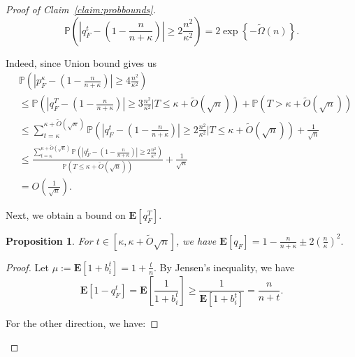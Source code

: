 \documentclass[11pt]{amsart}
\newtheorem{proposition}[theorem]{Proposition}
\begin{document}
\begin{proof}[Proof of Claim~\ref{claim:probbounds}]
\begin{equation}\label{eqn:p_F}
\mathbb{P}\left(\left|q_F^{t} - \left(1 - \frac{n}{n+\kappa}\right)\right| \geq 2\frac{n^2}{\kappa^2}\right) = 2\exp\left\{-\tilde{\Omega}(n)\right\}.
\end{equation}

Indeed, since Union bound gives us
\begin{align*}
&\mathbb{P}\left(\left|p_F^{\kappa} - \left(1 - \frac{n}{n+\kappa}\right)\right| \geq 4\frac{n^2}{\kappa^2}\right)\\
& \leq \mathbb{P}\left(\left|q_F^{T} - \left(1 - \frac{n}{n+\kappa}\right)\right| \geq 3\frac{n^2}{\kappa^2}\Big|T \leq \kappa + \tilde{O}(\sqrt{n})\right) + \mathbb{P}(T > \kappa + \tilde{O}(\sqrt{n})) \\
&  \leq \sum_{t = \kappa}^{\kappa + \tilde{O}(\sqrt{n})}\mathbb{P}\left(\left|q_F^{t} - \left(1 - \frac{n}{n+\kappa}\right)\right| \geq 2\frac{n^2}{\kappa^2}\Big|T \leq \kappa + \tilde{O}(\sqrt{n})\right) + \frac{1}{\sqrt{n}} \\
& \leq \frac{\sum_{t = \kappa}^{\kappa + \tilde{O}(\sqrt{n})}\mathbb{P}\left(\left|q_F^{t} - \left(1 - \frac{n}{n+\kappa}\right)\right| \geq 2\frac{n^2}{\kappa^2}\right)}{\mathbb{P}\left(T \leq \kappa + \tilde{O}(\sqrt{n})\right)} + \frac{1}{\sqrt{n}}\\
&= O\left( \frac{1}{\sqrt{n}}\right).
\end{align*}

Next, we obtain a bound on $\mathbf{E}[q_F^T]$.

\begin{proposition}\label{prop:Ep_F}
For $t \in [\kappa, \kappa + \tilde{O}{\sqrt{n}}]$, we have $\mathbf{E}[q_F] = 1 - \frac{n}{n+\kappa} \pm 2\left(\frac{n}{\kappa}\right)^2.$
\end{proposition}

\begin{proof}
Let $\mu :=  \mathbf{E}[1+b_i^t] = 1 + \frac{t}{n}$. By Jensen's inequality, we have 
\[
\mathbf{E}[1- q_F^t] = \mathbf{E}\left[\frac{1}{1+b_i^t}\right] \geq \frac{1}{\mathbf{E}[1+b_i^t]} = \frac{n}{n+t}.
\] 

For the other direction, we have:


\end{proof}
\end{proof}
\end{document}

